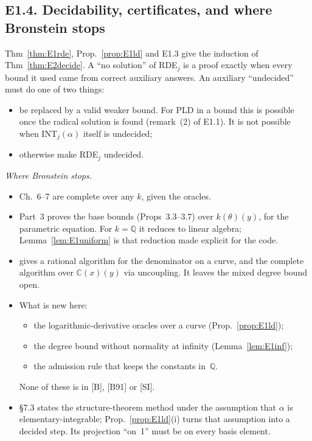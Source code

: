 \documentclass[11pt]{article}
\theoremstyle{definition}
\theoremstyle{remark}
\newcommand{\Q}{\mathbb{Q}}
\newcommand{\C}{\mathbb{C}}
\begin{document}
\subsection*{E1.4. Decidability, certificates, and where Bronstein stops}

Thm~\ref{thm:E1rde}, Prop.~\ref{prop:E1ld} and E1.3 give the induction of
Thm~\ref{thm:E2decide}. A ``no solution'' of RDE$_j$ is a proof exactly when every bound it
used came from correct auxiliary answers. An auxiliary ``undecided'' must do one of two things:
\begin{itemize}
\item be replaced by a valid weaker bound. For PLD in a bound this is possible once the radical
  solution is found (remark~(2) of E1.1). It is not possible when INT$_j(\alpha)$ itself is
  undecided;
\item otherwise make RDE$_j$ undecided.
\end{itemize}

\emph{Where Bronstein stops.}
\begin{itemize}
\item [SI] Ch.~6--7 are complete over any $k$, given the oracles.
\item [B] Part~3 proves the base bounds (Props~3.3--3.7) over $k(\theta)(y)$, for the
  parametric equation. For $k=\Q$ it reduces to linear algebra; Lemma~\ref{lem:E1uniform} is
  that reduction made explicit for the code.
\item [B91] gives a rational algorithm for the denominator on a curve, and the complete
  algorithm over $\C(x)(y)$ via uncoupling. It leaves the mixed degree bound open.
\item What is new here:
  \begin{itemize}
  \item the logarithmic-derivative oracles over a curve (Prop.~\ref{prop:E1ld});
  \item the degree bound without normality at infinity (Lemma~\ref{lem:E1inf});
  \item the admission rule that keeps the constants in~$\Q$.
  \end{itemize}
  None of these is in [B], [B91] or [SI].
\item [SI] \S7.3 states the structure-theorem method under the assumption that $\alpha$ is
  elementary-integrable; Prop.~\ref{prop:E1ld}(i) turns that assumption into a decided step.
  Its projection ``on~1'' must be on every basis element.
\end{itemize}
\end{document}
